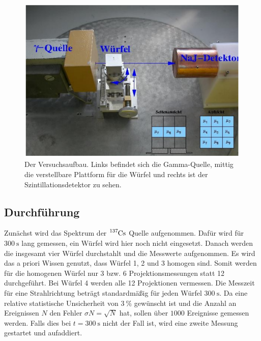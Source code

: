 \begin{figure}[H]
    \centering
    \includegraphics[width=\textwidth]{bilder/Aufbau.png}
    \caption{Der Versuchsaufbau. Links befindet sich die Gamma-Quelle, mittig die verstellbare Plattform für die Würfel und rechts ist der Szintillationsdetektor zu sehen. \cite{anleitung}}
    \label{fig:Aufbau}
\end{figure}

\subsection{Durchführung}
Zunächst wird das Spektrum der $\ce{^{137}Cs}$ Quelle aufgenommen.
Dafür wird für $\SI{300}{\second}$ lang gemessen, ein Würfel wird hier noch nicht eingesetzt.
Danach werden die insgesamt vier Würfel durchstahlt und die Messwerte aufgenommen.
Es wird das a priori Wissen genutzt, dass Würfel 1, 2 und 3 homogen sind.
Somit werden für die homogenen Würfel nur 3 bzw. 6 Projektionsmessungen statt 12 durchgeführt.
Bei Würfel 4 werden alle 12 Projektionen vermessen.
Die Messzeit für eine Strahlrichtung beträgt standardmäßig für jeden Würfel $\SI{300}{\second}$.
Da eine relative statistische Unsicherheit von $\SI{3}{\percent}$ gewünscht ist und die Anzahl an Ereignissen $N$ den Fehler $\sigma N = \sqrt{N}$ hat, 
sollen über $\num{1000}$ Ereignisse gemessen werden. Falls dies bei $t = \SI{300}{\second}$ nicht der Fall ist, wird eine zweite Messung gestartet und aufaddiert.